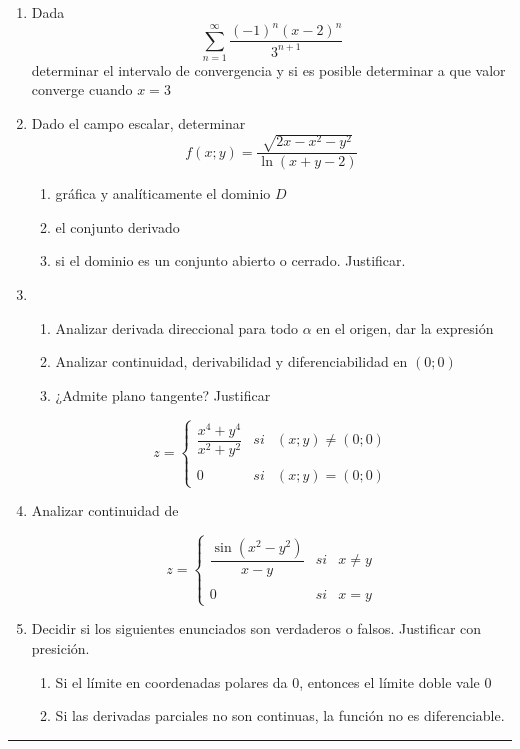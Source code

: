 \documentclass[9pt,a4paper]{extarticle}
\begin{document}
\begin{enumerate}
    \item Dada
    \[
    \sum_{n=1}^{\infty}\dfrac{(-1)^n(x-2)^n}{3^{n+1}}
    \]
   determinar el intervalo de convergencia y si es posible determinar a que valor converge cuando $ x=3 $
    
    
    \item Dado el campo escalar, determinar
    \[
    f(x;y)= \dfrac{\sqrt{2x-x^2-y^2}}{\ln{(x+y-2)}} 
    \]

    \begin{enumerate}
        \item gráfica y analíticamente el dominio $D$
        \item el conjunto derivado
        \item si el dominio es un conjunto abierto o cerrado. Justificar.
    \end{enumerate}
    
    
    \item 
    \begin{enumerate}
        \item Analizar derivada direccional para todo $\alpha$ en el origen, dar la expresión
        \item Analizar continuidad, derivabilidad y diferenciabilidad en $ (0;0) $
        \item ¿Admite plano tangente? Justificar
    \end{enumerate}
    \[
    z= \left\{ \begin{array}{lcc}
             \dfrac{x^4 + y^4}{x^2 + y^2} &   si  & (x;y) \neq (0;0) \\
             \\ 0 &  si & (x;y) = (0;0)
             \end{array}
   \right.
    \]
    
    \item Analizar continuidad de 
    
        \[
    z= \left\{ \begin{array}{lcc}
             \dfrac{\sin{(x^2-y^2)}}{x- y} &   si  & x \neq y \\
             \\ 0 &  si & x = y
             \end{array}
   \right.
    \]
    
    
    \item Decidir si los siguientes enunciados son verdaderos o falsos. Justificar con presición.
    \begin{enumerate}
        \item Si el límite en coordenadas polares da $0$, entonces el límite doble vale $0$
        \item Si las derivadas parciales no son continuas, la función no es diferenciable.
    \end{enumerate}
\end{enumerate}
\hrule
\end{document}
